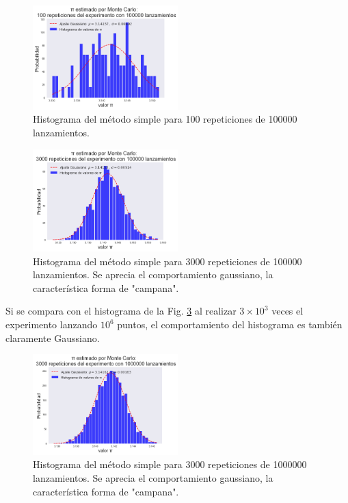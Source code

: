 \documentclass{rbf}
\begin{document}
\begin{figure}[h]
 \centering
  \includegraphics[width=0.5\textwidth]{figures/100rep.png}
	\caption{Histograma del método simple para 100 repeticiones de 100000 lanzamientos.}
 \label{buff1}
\end{figure}

\begin{figure}[tbp!]
 \centering
  \includegraphics[width=0.5\textwidth]{figures/3000rep1e5.png}
	\caption{Histograma del método simple para 3000 repeticiones de 100000 lanzamientos. Se aprecia el comportamiento gaussiano, la característica forma de "campana".}
 \label{buff2}
\end{figure}


Si se compara con el histograma de la Fig. \ref{buff3} al realizar $3 \times 10^3$ veces el experimento lanzando $10^6$ puntos, el comportamiento del histograma es también claramente Gaussiano.

\begin{figure}[tbp!]
 \centering
  \includegraphics[width=0.5\textwidth]{figures/3000rep1e6.png}
	\caption{Histograma del método simple para 3000 repeticiones de 1000000 lanzamientos. Se aprecia el comportamiento gaussiano, la característica forma de "campana".}
 \label{buff3}
\end{figure}
\end{document}
